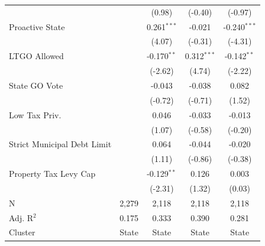 \begin{tabular*}{\textwidth}{@{\extracolsep{\fill}}lcccc}
                                                     &                & (0.98)        & (-0.40)      & (-0.97)\\   
   Proactive State                                   &                & 0.261$^{***}$  & -0.021        & -0.240$^{***}$\\   
                                                     &                & (4.07)        & (-0.31)      & (-4.31)\\   
   LTGO Allowed                                      &                & -0.170$^{**}$  & 0.312$^{***}$ & -0.142$^{**}$\\   
                                                     &                & (-2.62)       & (4.74)       & (-2.22)\\   
   State GO Vote                                     &                & -0.043         & -0.038        & 0.082\\   
                                                     &                & (-0.72)       & (-0.71)      & (1.52)\\   
   Low Tax Priv.                                     &                & 0.046          & -0.033        & -0.013\\   
                                                     &                & (1.07)        & (-0.58)      & (-0.20)\\   
   Strict Municipal Debt Limit                       &                & 0.064          & -0.044        & -0.020\\   
                                                     &                & (1.11)        & (-0.86)      & (-0.38)\\   
   Property Tax Levy Cap                             &                & -0.129$^{**}$  & 0.126         & 0.003\\   
                                                     &                & (-2.31)       & (1.32)       & (0.03)\\   
   \hline
   N                                      & 2,279          & 2,118          & 2,118         & 2,118\\  
   Adj. R$^2$                                    & 0.175          & 0.333          & 0.390         & 0.281\\  
   Cluster              & State & State & State & State\\  
   \bottomrule
\end{tabular*}
\par\endgroup
